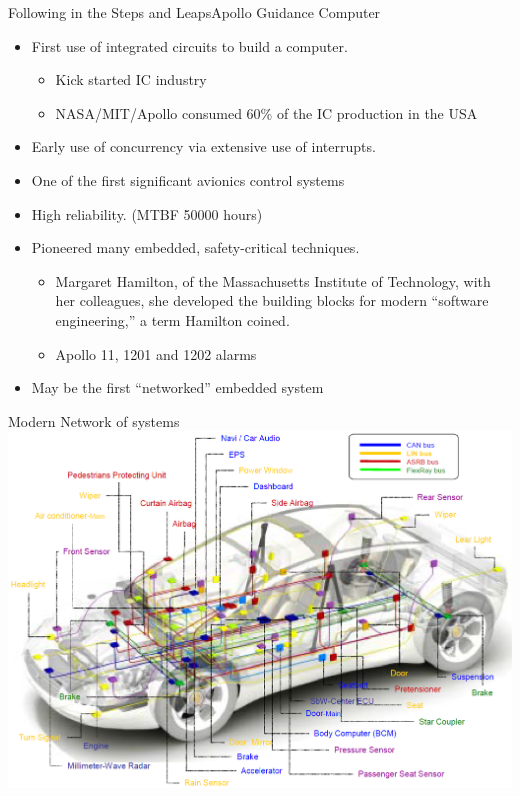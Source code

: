 \documentclass[xcolor=svgnames]{beamer}
\begin{document}
\begin{frame}{Following in the Steps and Leaps}{Apollo Guidance Computer}
\begin{itemize}[<+->]
  \item First use of integrated circuits to build a computer.
  \begin{itemize}
    \item Kick started IC industry
    \item NASA/MIT/Apollo consumed 60\% of the IC production in the USA
  \end{itemize}
  \item Early use of concurrency via extensive use of interrupts.
  \item One of the first significant avionics control systems
  \item High reliability.  (MTBF 50000 hours)
  \item Pioneered many embedded, safety-critical techniques.
  \begin{itemize}
    \item Margaret Hamilton, of the Massachusetts Institute of Technology,
      with her colleagues, she developed the building blocks for modern
      ``software engineering,''
      a term Hamilton coined.
    \item Apollo 11, 1201 and 1202 alarms
  \end{itemize}
  \item May be the first ``networked'' embedded system

\end{itemize}
\end{frame}

\begin{frame}{Modern Network of systems}
    \includegraphics[width=\textwidth]{CAN-car.png}
\end{frame}
\end{document}
